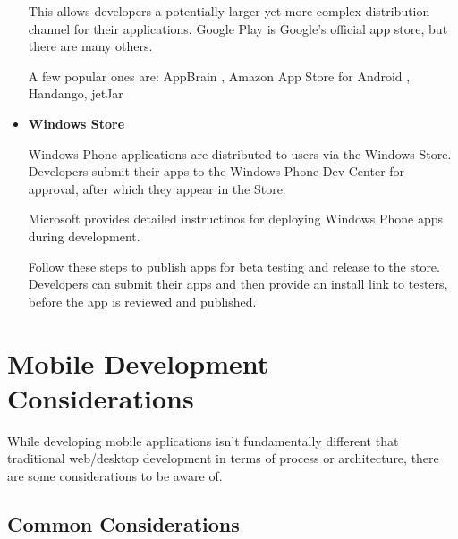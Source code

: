 \begin{itemize}
This allows developers a potentially larger yet more complex distribution channel for their applications. Google Play is Google’s official app store, but there are many others.

A few popular ones are: AppBrain , Amazon App Store for Android , Handango, jetJar

\item \textbf{Windows Store}

Windows Phone applications are distributed to users via the Windows Store. Developers submit their apps to the Windows Phone Dev Center for approval, after which they appear in the Store.

Microsoft provides detailed instructinos for deploying Windows Phone apps during development.

Follow these steps to publish apps for beta testing and release to the store. Developers can submit their apps and then provide an install link to testers, before the app is reviewed and published.

\end{itemize}

\section{Mobile Development Considerations}

While developing mobile applications isn’t fundamentally different that traditional web/desktop development in terms of process or architecture, there are some considerations to be aware of.

\subsection{Common Considerations}

